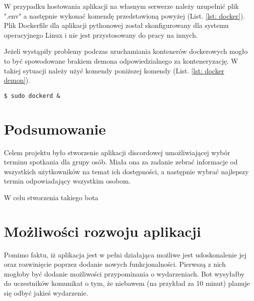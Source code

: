 \documentclass[11pt,a4paper]{article}
\begin{document}
W przypadku hostowania aplikacji na własnym serwerze należy uzupełnić plik ".env" a następnie wykonać komendę przedstawioną powyżej (List. \ref{lst: docker}). Plik Dockerfile dla aplikacji pythonowej został skonfigurowany dla systemu operacyjnego Linux i nie jest przystosowany do pracy na innych.

Jeżeli wystąpiły problemy podczas uruchamiania kontenerów dockerowych mogło to być spowodowane brakiem demona odpowiedzialnego za konteneryzację. W takiej sytuacji należy użyć komendy poniższej komendy (List. \ref{lst: docker demon}).

\begin{lstlisting}[label={lst: docker demon},caption={Uruchamianie demona dockerowego}]
    $ sudo dockerd &
\end{lstlisting}

\section{Podsumowanie}

Celem projektu było stworzenie aplikacji discordowej umożliwiającej wybór terminu spotkania dla grupy osób. Miała ona za zadanie zebrać informacje od wszystkich użytkowników na temat ich dostępności, a następnie wybrać najlepszy termin odpowiadający wszystkim osobom. 

W celu stworzenia takiego bota 



\section{Możliwości rozwoju aplikacji}
Pomimo faktu, iż aplikacja jest w pełni działająca możliwe jest udoskonalenie jej oraz rozwinięcie poprzez dodanie nowych funkcjonalności. Pierwszą z nich mogłoby być dodanie możliwości przypominania o wydarzeniach. Bot wysyłałby do uczestników komunikat o tym, że niebawem (na przykład za 10 minut) planuje się odbyć jakieś wydarzenie.

\newpage
\printbibliography[title={Bibliografia}]
\end{document}
